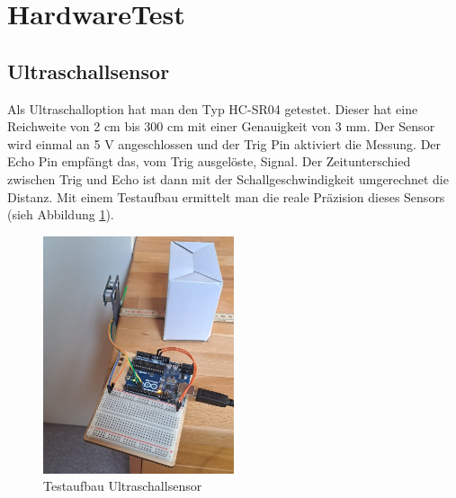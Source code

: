 

% 


\newpage
\section{HardwareTest}

\subsection{Ultraschallsensor}
Als Ultraschalloption hat man den Typ HC-SR04 getestet. Dieser hat eine Reichweite von 2 cm bis 300 cm mit einer Genauigkeit von 3 mm. Der Sensor wird einmal an 5 V angeschlossen und der Trig Pin aktiviert die Messung. Der Echo Pin empfängt das, vom Trig ausgelöste, Signal. Der Zeitunterschied zwischen Trig und Echo ist dann mit der Schallgeschwindigkeit umgerechnet die Distanz. Mit einem Testaufbau ermittelt man die reale Präzision dieses Sensors (sieh Abbildung \ref{fig:Ultraschall1}).

\begin{figure}[h] %
    \centering
    \includegraphics[width=0.5\textwidth]{img/sensortest/Ultraschall_Senkrecht.jpg} %
    \caption{Testaufbau Ultraschallsensor}
    \label{fig:Ultraschall1} %
\end{figure}


